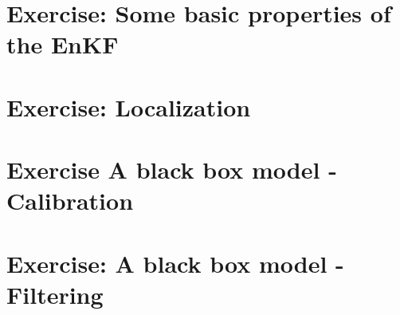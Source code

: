 \documentclass[a4paper,10pt]{article}
\begin{document}
\section{Exercise: Some basic properties of the EnKF}


%


\section{Exercise: Localization}


\section{Exercise  A black box model - Calibration}
\newcommand{\opgave}{exercise\_black\_box\_calibration\_polution}




\section{Exercise: A black box model - Filtering}
\renewcommand{\opgave}{exercise\_black\_box\_enkf\_polution}


%
\end{document}
